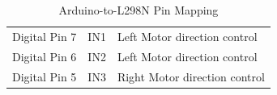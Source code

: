\documentclass[12pt,a4paper,oneside]{report}
\begin{document}
\begin{longtable}[]{@{}
  >{\raggedright\arraybackslash}p{}
  >{\raggedright\arraybackslash}p{}
  >{\raggedright\arraybackslash}p{}@{}}
\caption{Arduino-to-L298N Pin Mapping\label{tab:table9}}\\

\toprule\noalign{}
\begin{minipage}[b]{\linewidth}\raggedright

Digital Pin 7

\end{minipage} & \begin{minipage}[b]{\linewidth}\centering

IN1

\end{minipage} & \begin{minipage}[b]{\linewidth}\raggedright

Left Motor direction control

\end{minipage} \\
\begin{minipage}[b]{\linewidth}\raggedright

Digital Pin 6

\end{minipage} & \begin{minipage}[b]{\linewidth}\centering

IN2

\end{minipage} & \begin{minipage}[b]{\linewidth}\raggedright

Left Motor direction control

\end{minipage} \\
\begin{minipage}[b]{\linewidth}\raggedright

Digital Pin 5

\end{minipage} & \begin{minipage}[b]{\linewidth}\centering

IN3

\end{minipage} & \begin{minipage}[b]{\linewidth}\raggedright

Right Motor direction control


\end{minipage}
\end{longtable}
\end{document}
